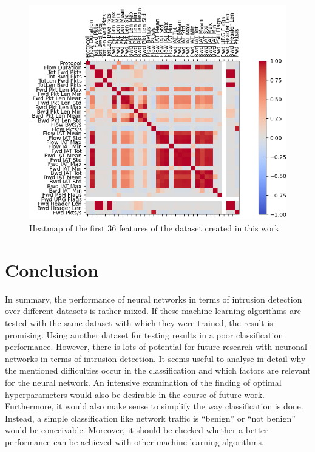 \documentclass[conference]{IEEEtran}
\begin{document}
\begin{figure}[htbp]  
\centerline{\includegraphics[scale=0.8]{Heatmap-NeueDaten-0-35.png}}
\caption{Heatmap of the first 36 features of the dataset created in this work}
\label{fig:hm2}
\end{figure}

\section{Conclusion}\label{conclusion}
In summary, the performance of neural networks in terms of intrusion detection over different datasets is rather mixed. If these machine learning algorithms are tested with the same dataset with which they were trained, the result is promising. Using another dataset for testing results in a poor classification performance. However, there is lots of potential for future research with neuronal networks in terms of intrusion detection. It seems useful to analyse in detail why the mentioned difficulties occur in the classification and which factors are relevant for the neural network. An intensive examination of the finding of optimal hyperparameters would also be desirable in the course of future work. Furthermore, it would also make sense to simplify the way classification is done. Instead, a simple classification like network traffic is “benign” or “not benign” would be conceivable. Moreover, it should be checked whether a better performance can be achieved with other machine learning algorithms.
\end{document}
